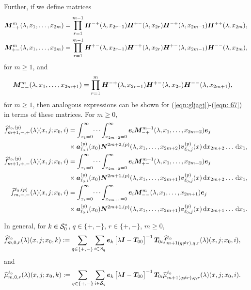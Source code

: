 Further, if we define matrices
\begin{align*}
	\boldsymbol M^{m}_{-+}(\lambda,x_1,\dots,x_{2m}) &= \prod_{r=1}^{m-1}\boldsymbol H^{-+}(\lambda,x_{2r-1})\boldsymbol H^{+-}(\lambda,x_{2r}) \boldsymbol H^{-+}(\lambda,x_{2m-1}) \boldsymbol H^{++}(\lambda,x_{2m}),
	\\\boldsymbol M^{m}_{+-}(\lambda,x_1,\dots,x_{2m}) &= \prod_{r=1}^{m-1}\boldsymbol H^{+-}(\lambda,x_{2r-1})\boldsymbol H^{-+}(\lambda,x_{2r}) \boldsymbol H^{+-}(\lambda,x_{2m-1}) \boldsymbol H^{--}(\lambda,x_{2m}),
\end{align*}
for \(m\geq 1\), and
\begin{align*}
	&\boldsymbol M^{m}_{--}(\lambda,x_1,\dots,x_{2m+1}) \nonumber 
	= \prod_{r=1}^{m}\boldsymbol H^{-+}(\lambda,x_{2r-1})\boldsymbol H^{+-}(\lambda,x_{2r}) 
	\boldsymbol H^{--}(\lambda,x_{2m+1}),\nonumber 
\end{align*}
for \(m\geq 1\), then analogous expressions can be shown for (\ref{eqn:gljagj})-(\ref{eqn: 67}) in terms of these matrices. For \(m\geq 0\), 
\begin{align*}
	\widehat f^{\ell_0,(p)}_{m+1,-,+}(\lambda)(x, j; x_0,i) &= 
		\int_{x_1=0}^\infty \dots \int_{x_{2m+2}=0}^\infty \boldsymbol e_i\boldsymbol M^{m+1}_{-+}(\lambda,x_1,\dots,x_{2m+2})\boldsymbol e_j \nonumber 
		\\&\times \boldsymbol a_{\ell_0,i}^{(p)}(x_0) \boldsymbol N^{2m+2,(p)}(\lambda,x_1,\dots,x_{2m+2}) {\boldsymbol v}_{\ell_0,j}^{(p)}( x)\, \mathrm{d} x_{2m+2}\dots\, \mathrm{d} x_1,
	\\ \widehat f^{\ell_0,(p)}_{m+1,+,-}(\lambda)(x, j; x_0,i) &= 
		\int_{x_1=0}^\infty \dots \int_{x_{2m+2}=0}^\infty \boldsymbol e_i\boldsymbol M^{m+1}_{+-}(\lambda,x_1,\dots,x_{2m+2})\boldsymbol e_j \nonumber 
		\\&\times \boldsymbol a_{\ell_0,i}^{(p)}(x_0) \boldsymbol N^{2m+1,(p)}(\lambda,x_1,\dots,x_{2m+1}) {\boldsymbol v}_{\ell_0,j}^{(p)}( x)\, \mathrm{d} x_{2m+2}\dots\, \mathrm{d} x_1,
	\\ \widehat f^{\ell_0,(p)}_{m,-,-}(\lambda)(x, j; x_0,i) &= 
		\int_{x_1=0}^\infty \dots \int_{x_{2m+1}=0}^\infty \boldsymbol e_i\boldsymbol M^m_{--}(\lambda,x_1,\dots,x_{2m+1})\boldsymbol e_j \nonumber 
		\\&\times \boldsymbol a_{\ell_0,i}^{(p)}(x_0) \boldsymbol N^{2m+1,(p)}(\lambda,x_1,\dots,x_{2m+1}) {\boldsymbol v}_{\ell_0,j}^{(p)}( x)\, \mathrm{d} x_{2m+1}\dots\, \mathrm{d} x_1.
\end{align*}

In general, for \(k\in\mathcal{S}_0^*\), \(q\in \{+,-\}, \, r\in\{+,-\}\), \(m\geq 0\),
\begin{align}
	\widehat f_{m,0,r}^{\ell_0}(\lambda)(x,j;x_0,k)  
	&:= \sum_{q\in\{+,-\}}\sum_{i\in\mathcal{S}_q}\boldsymbol e_k\begin{bmatrix} \lambda \boldsymbol I - \boldsymbol T_{00} \end{bmatrix}^{-1}\boldsymbol T_{0i}\widehat f_{m+1(q\neq r),q,r}^{\ell_0}(\lambda)(x,j;x_0,i), \label{eqn: vma}
\end{align}
and
\begin{align}
	\widehat \mu_{m,0,r}^{\ell_0}(\lambda)(x,j;x_0,k) \label{eqn:kdneee}
	&:= \sum_{q\in\{+,-\}}\sum_{i\in\mathcal{S}_q}\boldsymbol e_k\begin{bmatrix} \lambda \boldsymbol I - \boldsymbol T_{00} \end{bmatrix}^{-1}\boldsymbol T_{0i}\widehat \mu_{m+1(q\neq r),q,r}^{\ell_0}(\lambda)(x,j;x_0,i).
\end{align}

